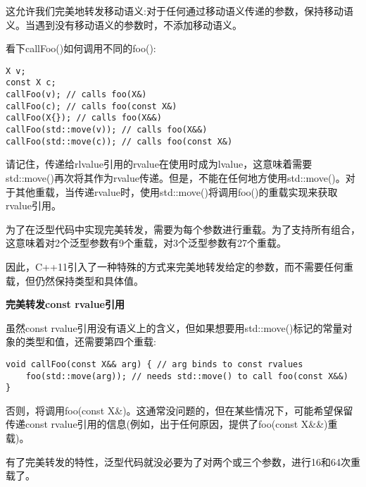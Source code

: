 这允许我们完美地转发移动语义:对于任何通过移动语义传递的参数，保持移动语义。当遇到没有移动语义的参数时，不添加移动语义。\par

看下callFoo()如何调用不同的foo():\par

\begin{lstlisting}[caption={}]
X v;
const X c;
callFoo(v); // calls foo(X&)
callFoo(c); // calls foo(const X&)
callFoo(X{}); // calls foo(X&&)
callFoo(std::move(v)); // calls foo(X&&)
callFoo(std::move(c)); // calls foo(const X&)
\end{lstlisting}

请记住，传递给rlvalue引用的rvalue在使用时成为lvalue，这意味着需要std::move()再次将其作为rvalue传递。但是，不能在任何地方使用std::move()。对于其他重载，当传递rvalue时，使用std::move()将调用foo()的重载实现来获取rvalue引用。\par

为了在泛型代码中实现完美转发，需要为每个参数进行重载。为了支持所有组合，这意味着对2个泛型参数有9个重载，对3个泛型参数有27个重载。\par

因此，C++11引入了一种特殊的方式来完美地转发给定的参数，而不需要任何重载，但仍然保持类型和具体值。\par

\hspace*{\fill} \par %
\textbf{完美转发const rvalue引用}

虽然const rvalue引用没有语义上的含义，但如果想要用std::move()标记的常量对象的类型和值，还需要第四个重载:\par

\begin{lstlisting}[caption={}]
void callFoo(const X&& arg) { // arg binds to const rvalues
	foo(std::move(arg)); // needs std::move() to call foo(const X&&)
}
\end{lstlisting}

否则，将调用foo(const X\&)。这通常没问题的，但在某些情况下，可能希望保留传递const rvalue引用的信息(例如，出于任何原因，提供了foo(const X\&\&)重载)。\par

有了完美转发的特性，泛型代码就没必要为了对两个或三个参数，进行16和64次重载了。\par


















